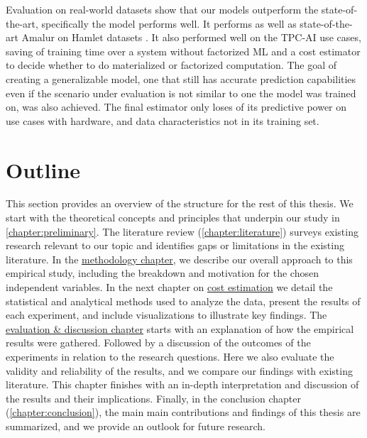 Evaluation on real-world datasets show that our models outperform the state-of-the-art, specifically the  model performs well. It performs  as well as state-of-the-art Amalur \cite{schijndel_cost_estimation} on Hamlet datasets \cite{2016hamletsigmod}. It also performed well on the TPC-AI use cases, saving  of training time over a system without factorized ML and a cost estimator to decide whether to do materialized or factorized computation. The goal of creating a generalizable model, one that still has accurate prediction capabilities even if the scenario under evaluation is not similar to one the model was trained on, was also achieved. The final estimator only loses  of its predictive power on use cases with hardware, and data characteristics not in its training set.


\section{Outline}
This section provides an overview of the structure for the rest of this thesis. We start with the theoretical concepts and principles that underpin our study in \autoref{chapter:preliminary}. The literature review (\autoref{chapter:literature}) surveys existing research relevant to our topic and identifies gaps or limitations in the existing literature. In the \hyperref[chapter:methodology]{methodology chapter}, we describe our overall approach to this empirical study, including the breakdown and motivation for the chosen independent variables.  In the next chapter on \hyperref[chapter:cost-estimations]{cost estimation} we detail the statistical and analytical methods used to analyze the data, present the results of each experiment, and include visualizations to illustrate key findings. The \hyperref[chapter:evaluation-discussion]{evaluation \& discussion chapter} starts with an explanation of how the empirical results were gathered. Followed by a discussion of the outcomes of the experiments in relation to the research questions. Here we also evaluate the validity and reliability of the results, and we compare our findings with existing literature. This chapter finishes with an in-depth interpretation and discussion of the results and their implications.  Finally, in the conclusion chapter (\autoref{chapter:conclusion}), the main main contributions and findings of this thesis are summarized, and we provide an outlook for future research.

